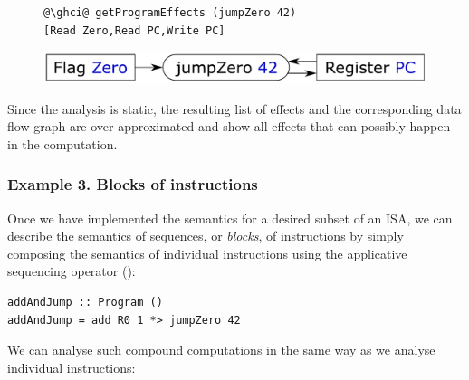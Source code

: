 \vspace{1mm}
\begin{figure}[!h]
 \begin{minipage}{0.45\textwidth}
\raggedleft
\begin{verbatim}
@\ghci@ getProgramEffects (jumpZero 42)
[Read Zero,Read PC,Write PC]
\end{verbatim}
 \end{minipage}
 \begin{minipage}{0.54\textwidth}
  \centering
  \includegraphics[scale=0.3]{fig/jumpZero.pdf}
 \end{minipage}
\end{figure}
\vspace{1mm}

\noindent
Since the analysis is static, the resulting list of effects and the
corresponding data flow graph are over-approximated and show all effects that
can possibly happen in the computation.


\subsubsection{Example 3. Blocks of instructions}

Once we have implemented the semantics for a desired subset of an ISA, we can
describe the semantics of sequences, or \emph{blocks}, of instructions by
simply composing the semantics of individual instructions using the applicative
sequencing operator (\hs{*>}):

\vspace{1mm}
\begin{verbatim}
addAndJump :: Program ()
addAndJump = add R0 1 *> jumpZero 42
\end{verbatim}
\vspace{1mm}

\noindent
We can analyse such compound computations in the same way as we analyse
individual instructions:

